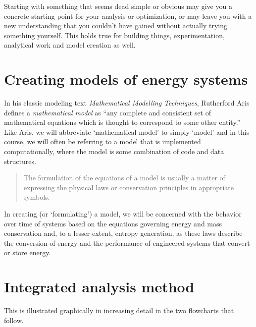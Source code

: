 \documentclass[10pt]{article}
\begin{document}
Starting with something that seems dead simple or obvious may give you a concrete starting point for your analysis or optimization, or may leave you with a new understanding that you couldn't have gained without actually trying something yourself. This holds true for building things, experimentation, analytical work and model creation as well. %



\section{Creating models of energy systems}
In his classic modeling text \textit{Mathematical Modelling Techniques}, Rutherford Aris defines a \textit{mathematical model} as ``any complete and consistent set of mathematical equations which is thought to correspond to some other entity.'' \cite{aris} Like Aris, we will abbreviate `mathematical model' to simply `model' and in this course, we will often be referring to a model that is implemented computationally, where the model is some combination of code and data structures.

\begin{quote}
The formulation of the equations of a model is usually a matter of expressing the physical laws or conservation principles in appropriate symbols. \cite{aris}    
\end{quote}


In creating (or `formulating') a model, we will be concerned with the behavior over time of systems based on the equations governing energy and mass conservation and, to a lesser extent, entropy generation, as these laws describe the conversion of energy and the performance of engineered systems that convert or store energy. 

\section{Integrated analysis method}

This is illustrated graphically in increasing detail in the two flowcharts that follow.
\end{document}
